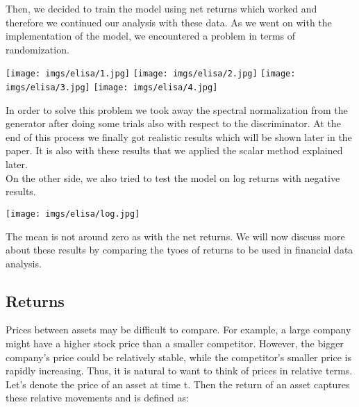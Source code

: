 \documentclass{article}
\begin{document}
    Then, we decided to train the model using net returns which worked and therefore we continued our analysis with these data. As we went on with the implementation of the model, we encountered a problem in terms of randomization.\\

    \begin{center}
        \texttt{[image: imgs/elisa/1.jpg]}
        \texttt{[image: imgs/elisa/2.jpg]}
        \texttt{[image: imgs/elisa/3.jpg]}
        \texttt{[image: imgs/elisa/4.jpg]}
    \end{center}

    In order to solve this problem we took away the spectral normalization from the generator after doing some trials also with respect to the discriminator. At the end of this process we finally got realistic results which will be shown later in the paper. It is also with these results that we applied the scalar method explained later. \\

    On the other side, we also tried to test the model on log returns with negative results.\\

    \begin{center}
        \texttt{[image: imgs/elisa/log.jpg]}
    \end{center}

    The mean is not around zero as with the net returns. We will now discuss more about these results by comparing the tyoes of returns to be used in financial data analysis.\\

    \subsection*{Returns}
    Prices between assets may be difficult to compare. For example, a large company might have a higher stock price than a smaller competitor. However, the bigger company's price could be relatively stable, while the competitor's smaller price is rapidly increasing. Thus, it is natural to want to think of prices in relative terms. Let's denote the price of an asset at time t. Then the return of an asset captures these relative movements and is defined as:
\end{document}
